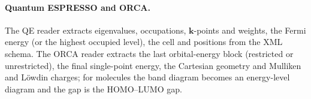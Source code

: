 \paragraph{Quantum ESPRESSO and ORCA.} The QE reader extracts eigenvalues, occupations, $\bm{k}$-points and weights, the Fermi energy (or the highest occupied level), the cell and positions from the XML schema. The ORCA reader extracts the last orbital-energy block (restricted or unrestricted), the final single-point energy, the Cartesian geometry and Mulliken and Löwdin charges; for molecules the band diagram becomes an energy-level diagram and the gap is the HOMO–LUMO gap.
